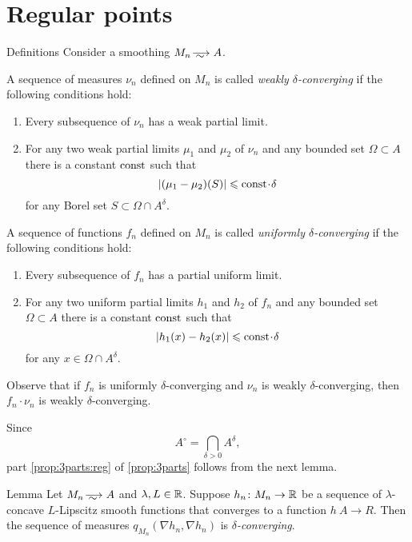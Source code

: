 \section{Regular points}\label{sec:ref}

\begin{thm}{Definitions}\label{def:delta-converge}
Consider a smoothing $M_n\smooths{} A$.

A sequence of measures $\nu_n$ defined on $M_n$ is called \emph{weakly $\delta$-converging}
if the following conditions hold:
\begin{enumerate}
 \item Every subsequence of $\nu_n$ has a weak partial limit.
 \item For any two weak partial limits $\mu_1$ and $\mu_2$ of $\nu_n$ and any bounded set $\Omega\subset A$ there is a constant $\mathrm{const}$ such that 
\[|(\mu_1-\mu_2)(S)|\le \const\cdot \delta\]
for any Borel set $S\subset \Omega\cap A^\delta$.
\end{enumerate}

A sequence of functions $f_n$ defined on $M_n$ is called \emph{uniformly $\delta$-converging}
if the following conditions hold:
\begin{enumerate}
 \item Every subsequence of $f_n$ has a partial uniform limit.
 \item For any two uniform partial limits $h_1$ and $h_2$ of $f_n$ and any bounded set $\Omega\subset A$ there is a constant $\mathrm{const}$ such that 
\[|h_1(x)-h_2(x)|\le\const\cdot \delta\]
for any $x\in \Omega\cap A^\delta$.
\end{enumerate}

\end{thm}

Observe that if $f_n$ is uniformly $\delta$-converging and $\nu_n$ is weakly $\delta$-converging,
then $f_n\cdot \nu_n$ is weakly $\delta$-converging.

Since 
\[A^\circ=\bigcap_{\delta>0}A^\delta,\]
part \ref{prop:3parts:reg} of \ref{prop:3parts} follows from the next lemma.

\begin{thm}{Lemma}\label{A^0}
Let $M_n\smooths{} A$ and $\lambda,L\in\mathbb{R}$.
Suppose $h_n\colon M_n\to\mathbb{R}$ be a sequence of $\lambda$-concave $L$-Lipscitz smooth functions that converges to a function $h\:A\to R$.
Then the sequence of measures $q_{M_n}(\nabla h_n,\nabla h_n)$ is \emph{$\delta$-converging}.
\end{thm}

